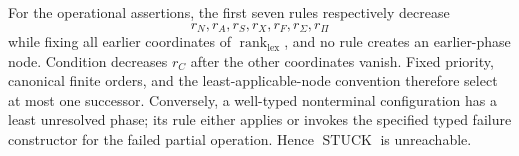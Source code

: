For the operational assertions, the first seven rules respectively decrease
\[
r_N,r_A,r_S,r_X,r_F,r_{\Sigma},r_{\Pi}
\]
while fixing all earlier coordinates of \(\operatorname{rank}_{\mathrm{lex}}\), and no rule creates an earlier-phase node. Condition decreases \(r_C\) after the other coordinates vanish. Fixed priority, canonical finite orders, and the least-applicable-node convention therefore select at most one successor. Conversely, a well-typed nonterminal configuration has a least unresolved phase; its rule either applies or invokes the specified typed failure constructor for the failed partial operation. Hence \(\operatorname{STUCK}\) is unreachable.
